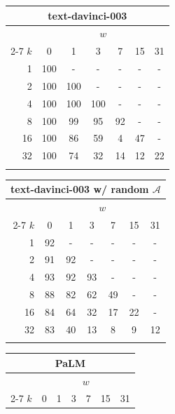 \begin{table}[h]
\parbox{.32\linewidth}{
    \small
    \setlength\tabcolsep{3.5pt}
    \centering
    \begin{tabular}{@{}rcccccc@{}}
    \multicolumn{7}{c}{text-davinci-003} \\
    \toprule
    & \multicolumn{6}{c}{$w$} \\
    \cmidrule(lr){2-7}
    $k$&0&1&3&7&15&31 \\
    \midrule
    1&100&-&-&-&-&- \\
    2&100&100&-&-&-&- \\
    4&100&100&100&-&-&- \\
    8&100&99&95&92&-&- \\
    16&100&86&59&4&47&- \\
    32&100&74&32&14&12&22 \\
    \bottomrule
    \vspace{-0.5em}
    \end{tabular}
    \vspace{-1.0em}
    \label{tab:pcfg-results-kw-davinci}
}
\parbox{.32\linewidth}{
    \small
    \setlength\tabcolsep{3.5pt}
    \centering
    \begin{tabular}{@{}rcccccc@{}}
    \multicolumn{7}{c}{text-davinci-003 w/ random $\mathcal{A}$} \\
    \toprule
    & \multicolumn{6}{c}{$w$} \\
    \cmidrule(lr){2-7}
    $k$&0&1&3&7&15&31 \\
    \midrule
    1&92&-&-&-&-&- \\
    2&91&92&-&-&-&- \\
    4&93&92&93&-&-&- \\
    8&88&82&62&49&-&- \\
    16&84&64&32&17&22&- \\
    32&83&40&13&8&9&12 \\
    \bottomrule
    \vspace{-0.5em}
    \end{tabular}
    \vspace{-1.0em}
    \label{tab:pcfg-results-kw-davinci-rand}
}
\parbox{.32\linewidth}{
    \small
    \setlength\tabcolsep{3.5pt}
    \centering
    \begin{tabular}{@{}rcccccc@{}}
    \multicolumn{7}{c}{PaLM} \\
    \toprule
    & \multicolumn{6}{c}{$w$} \\
    \cmidrule(lr){2-7}
    $k$&0&1&3&7&15&31 \\

\end{tabular}}
\end{table}
